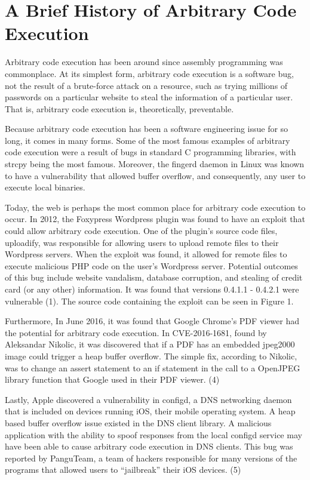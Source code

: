 \section{A Brief History of Arbitrary Code Execution}

Arbitrary code execution has been around since assembly programming was commonplace. At its simplest form, arbitrary code execution is a software bug, not the result of a brute-force attack on a resource, such as trying millions of passwords on a particular website to steal the information of a particular user. That is, arbitrary code execution is, theoretically, preventable.

Because arbitrary code execution has been a software engineering issue for so long, it comes in many forms. Some of the most famous examples of arbitrary code execution were a result of bugs in standard C programming libraries, with strcpy being the most famous. Moreover, the fingerd daemon in Linux was known to have a vulnerability that allowed buffer overflow, and consequently, any user to execute local binaries.

Today, the web is perhaps the most common place for arbitrary code execution to occur. In 2012, the Foxypress Wordpress plugin was found to have an exploit that could allow arbitrary code execution. One of the plugin’s source code files, uploadify, was responsible for allowing users to upload remote files to their Wordpress servers. When the exploit was found, it allowed for remote files to execute malicious PHP code on the user’s Wordpress server. Potential outcomes of this bug include website vandalism, database corruption, and stealing of credit card (or any other) information. It was found that versions 0.4.1.1 - 0.4.2.1 were vulnerable (1). The source code containing the exploit can be seen in Figure 1.

Furthermore, In June 2016, it was found that Google Chrome’s PDF viewer had the potential for arbitrary code execution. In CVE-2016-1681, found by Aleksandar Nikolic, it was discovered that if a PDF has an embedded jpeg2000 image could trigger a heap buffer overflow. The simple fix, according to Nikolic, was to change an assert statement to an if statement in the call to a  OpenJPEG library function that Google used in their PDF viewer. (4)

Lastly, Apple discovered a vulnerability in configd, a DNS networking daemon that is included on devices running iOS, their mobile operating system. A heap based buffer overflow issue existed in the DNS client library. A malicious application with the ability to spoof responses from the local configd service may have been able to cause arbitrary code execution in DNS clients. This bug was reported by PanguTeam, a team of hackers responsible for many versions of the programs that allowed users to “jailbreak” their iOS devices. (5)